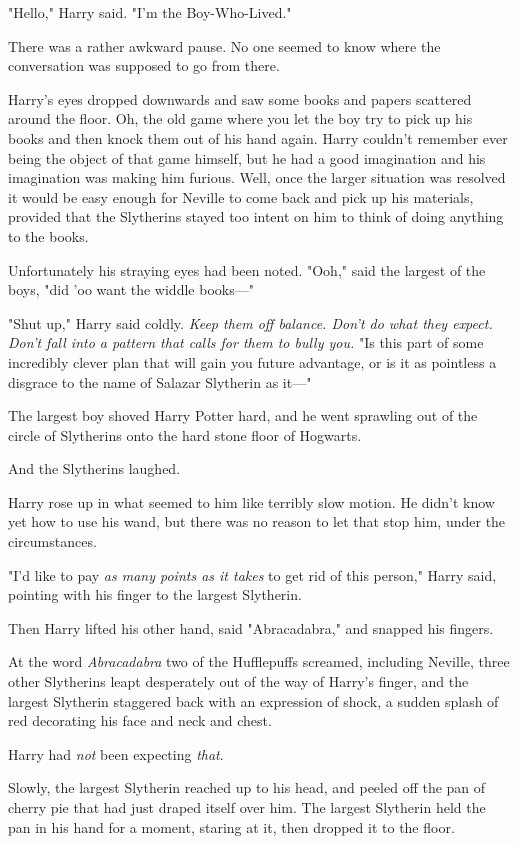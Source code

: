 "Hello," Harry said. "I'm the Boy-Who-Lived."

There was a rather awkward pause. No one seemed to know where the conversation 
was supposed to go from there.

Harry's eyes dropped downwards and saw some books and papers scattered around 
the floor. Oh, the old game where you let the boy try to pick up his books and 
then knock them out of his hand again. Harry couldn't remember ever being the 
object of that game himself, but he had a good imagination and his imagination 
was making him furious. Well, once the larger situation was resolved it would 
be easy enough for Neville to come back and pick up his materials, provided 
that the Slytherins stayed too intent on him to think of doing anything to the 
books.

Unfortunately his straying eyes had been noted. "Ooh," said the largest of the 
boys, "did 'oo want the widdle books---"

"Shut up," Harry said coldly. \emph{Keep them off balance. Don't do what they 
expect. Don't fall into a pattern that calls for them to bully you.} "Is this 
part of some incredibly clever plan that will gain you future advantage, or is 
it as pointless a disgrace to the name of Salazar Slytherin as it---"

The largest boy shoved Harry Potter hard, and he went sprawling out of the 
circle of Slytherins onto the hard stone floor of Hogwarts.

And the Slytherins laughed.

Harry rose up in what seemed to him like terribly slow motion. He didn't know 
yet how to use his wand, but there was no reason to let that stop him, under 
the circumstances.

"I'd like to pay \emph{as many points as it takes} to get rid of this person," 
Harry said, pointing with his finger to the largest Slytherin.

Then Harry lifted his other hand, said "Abracadabra," and snapped his fingers.

At the word \emph{Abracadabra} two of the Hufflepuffs screamed, including 
Neville, three other Slytherins leapt desperately out of the way of Harry's 
finger, and the largest Slytherin staggered back with an expression of shock, a 
sudden splash of red decorating his face and neck and chest.

Harry had \emph{not} been expecting \emph{that}.

Slowly, the largest Slytherin reached up to his head, and peeled off the pan of 
cherry pie that had just draped itself over him. The largest Slytherin held the 
pan in his hand for a moment, staring at it, then dropped it to the floor.

